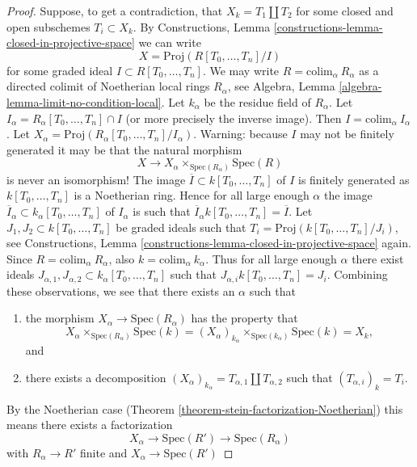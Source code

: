 \begin{proof}
\medskip\noindent
Suppose, to get a contradiction,
that $X_k = T_1 \coprod T_2$ for some closed and open subschemes
$T_i \subset X_k$. By
Constructions, Lemma \ref{constructions-lemma-closed-in-projective-space}
we can write
$$
X = \text{Proj}(R[T_0, \ldots, T_n]/I)
$$
for some graded ideal $I \subset R[T_0, \ldots, T_n]$.
We may write $R = \text{colim}_\alpha\ R_\alpha$ as a directed
colimit of Noetherian local rings $R_\alpha$, see
Algebra, Lemma \ref{algebra-lemma-limit-no-condition-local}.
Let $k_\alpha$ be the residue field of $R_\alpha$.
Let $I_\alpha = R_\alpha[T_0, \ldots, T_n] \cap I$ (or more precisely
the inverse image). Then $I = \text{colim}_\alpha\ I_\alpha$. Let
$X_\alpha = \text{Proj}(R_\alpha[T_0, \ldots, T_n]/I_\alpha)$.
Warning: because $I$ may not be finitely generated it may be
that the natural morphism
$$
X \longrightarrow X_\alpha \times_{\text{Spec}(R_\alpha)} \text{Spec}(R)
$$
is never an isomorphism!
The image $\overline{I} \subset k[T_0, \ldots, T_n]$ of $I$ is finitely
generated as $k[T_0, \ldots, T_n]$ is a Noetherian ring.
Hence for all large enough $\alpha$ the image
$\overline{I}_\alpha \subset k_\alpha[T_0, \ldots, T_n]$
of $I_\alpha$ is such that
$\overline{I}_\alpha k[T_0, \ldots, T_n] = \overline{I}$.
Let $J_1, J_2 \subset k[T_0, \ldots, T_n]$ be graded ideals such
that $T_i = \text{Proj}(k[T_0, \ldots, T_n]/J_i)$, see
Constructions, Lemma \ref{constructions-lemma-closed-in-projective-space}
again. Since $R = \text{colim}_\alpha\ R_\alpha$, also
$k = \text{colim}_\alpha\ k_\alpha$.
Thus for all large enough $\alpha$ there exist ideals
$J_{\alpha, 1}, J_{\alpha, 2} \subset k_\alpha[T_0, \ldots, T_n]$
such that $J_{\alpha, i} k[T_0, \ldots, T_n] = J_i$.
Combining these observations, we see that there exists
an $\alpha$ such that
\begin{enumerate}
\item the morphism $X_\alpha \to \text{Spec}(R_\alpha)$
has the property that
$$
X_\alpha \times_{\text{Spec}(R_\alpha)} \text{Spec}(k)
=
(X_\alpha)_{k_\alpha} \times_{\text{Spec}(k_\alpha)} \text{Spec}(k)
=
X_k,
$$
and
\item there exists a decomposition
$(X_\alpha)_{k_\alpha} = T_{\alpha, 1} \coprod T_{\alpha, 2}$ such
that $(T_{\alpha, i})_k = T_i$.
\end{enumerate}
By the Noetherian case (Theorem \ref{theorem-stein-factorization-Noetherian})
this means there exists a factorization
$$
X_\alpha \longrightarrow
\text{Spec}(R') \longrightarrow
\text{Spec}(R_\alpha)
$$
with $R_\alpha \to R'$ finite and $X_\alpha \to \text{Spec}(R')$

\end{proof}
